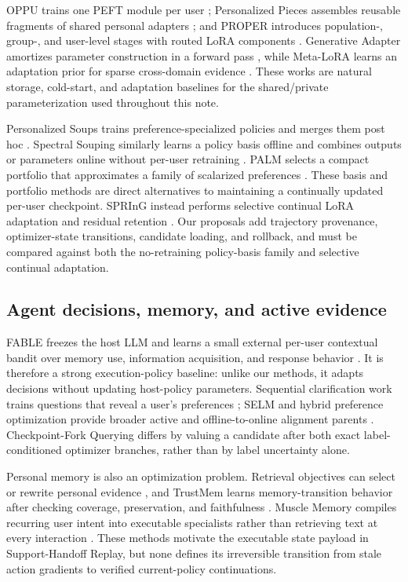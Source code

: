 OPPU trains one PEFT module per user \citep{tan2024oppu}; Personalized Pieces
assembles reusable fragments of shared personal adapters
\citep{tan2024pieces}; and PROPER introduces population-, group-, and
user-level stages with routed LoRA components \citep{zhang2025proper}.
Generative Adapter amortizes parameter construction in a forward pass
\citep{chen2024generativeadapter}, while Meta-LoRA learns an adaptation prior
for sparse cross-domain evidence \citep{wang2026metalora}.  These works are
natural storage, cold-start, and adaptation baselines for the shared/private
parameterization used throughout this note.

Personalized Soups trains preference-specialized policies and merges them
post hoc \citep{jang2023personalizedsoups}.  Spectral Souping similarly learns
a policy basis offline and combines outputs or parameters online without
per-user retraining \citep{chow2026spectral}.  PALM selects a compact
portfolio that approximates a family of scalarized preferences
\citep{kim2026manypreferences}.  These basis and portfolio methods are direct
alternatives to maintaining a continually updated per-user checkpoint.
SPRInG instead performs selective continual LoRA adaptation and residual
retention \citep{kim2026spring}.  Our proposals add trajectory provenance,
optimizer-state transitions, candidate loading, and rollback, and must be
compared against both the no-retraining policy-basis family and selective
continual adaptation.

\subsection{Agent decisions, memory, and active evidence}

FABLE freezes the host LLM and learns a small external per-user contextual
bandit over memory use, information acquisition, and response behavior
\citep{jin2026fable}.  It is therefore a strong execution-policy baseline:
unlike our methods, it adapts decisions without updating host-policy
parameters.  Sequential clarification work trains questions that reveal a
user's preferences \citep{montazeralghaem2025clarifying}; SELM and hybrid
preference optimization provide broader active and offline-to-online alignment
parents \citep{zhang2024selm,bose2024hybrid}.  Checkpoint-Fork Querying differs
by valuing a candidate after both exact label-conditioned optimizer branches,
rather than by label uncertainty alone.

Personal memory is also an optimization problem.  Retrieval objectives can
select or rewrite personal evidence \citep{salemi2024retrieval}, and TrustMem
learns memory-transition behavior after checking coverage, preservation, and
faithfulness \citep{yang2026trustmem}.  Muscle Memory compiles recurring user
intent into executable specialists rather than retrieving text at every
interaction \citep{omran2026muscle}.  These methods motivate the executable
state payload in Support-Handoff Replay, but none defines its irreversible
transition from stale action gradients to verified current-policy
continuations.

